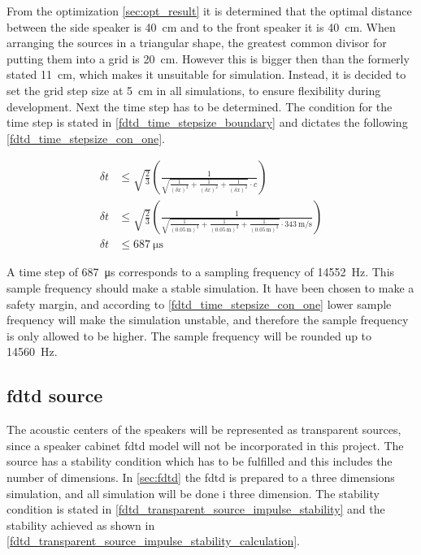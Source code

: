 From the optimization \autoref{sec:opt_result} it is determined that the optimal distance between the side speaker is \SI{40}{\centi\meter} and to the front speaker it is \SI{40}{\centi\meter}. When arranging the sources in a triangular shape, the greatest common divisor for putting them into a grid is \SI{20}{\centi\meter}. However this is bigger then than the formerly stated \SI{11}{\centi\meter}, which makes it unsuitable for simulation. Instead, it is decided to set the grid step size at \SI{5}{\centi\meter} in all simulations, to ensure flexibility during development. Next the time step has to be determined. The condition for the time step is stated in \autoref{fdtd_time_stepsize_boundary} and dictates the following \autoref{fdtd_time_stepsize_con_one}.
    
 
\begin{subequations}\label{fdtd_time_stepsize_con_one}
\begin{alignat}{2}
\delta t &\leq \sqrt{\frac{2}{3}}  \left( \frac{1}{\sqrt{\frac{1}{(\delta x)^2}+\frac{1}{(\delta x)^2}+\frac{1}{(\delta x)^2} }\cdot c} \right)\\
\delta t &\leq \sqrt{\frac{2}{3}}  \left( \frac{1}{\sqrt{\frac{1}{(\SI{0.05}{\meter})^2}+\frac{1}{(\SI{0.05}{\meter})^2}+\frac{1}{(\SI{0.05}{\meter})^2} }\cdot \SI{343}{\meter\per\second}} \right)\\
\delta t &\leq \SI{687}{\micro\second} 
\end{alignat}
\end{subequations}
    
A time step of \SI{687}{\micro\second}  corresponds to a sampling frequency of \SI{14552}{\hertz}. This sample frequency should make a stable simulation. It have been chosen to make a safety margin, and according to \autoref{fdtd_time_stepsize_con_one} lower sample frequency will make the simulation unstable, and therefore the sample frequency is only allowed to be higher. The sample frequency will be rounded up to \SI{14560}{\hertz}.
 
 

\subsection{\gls{fdtd} source}
The acoustic centers of the speakers will be represented as transparent sources, since a speaker cabinet \gls{fdtd} model will not be incorporated in this project. The source has a stability condition which has to be fulfilled and this includes the number of dimensions. In \autoref{sec:fdtd} the \gls{fdtd} is prepared to a three dimensions simulation, and all simulation will be done i three dimension.  The stability condition is stated in \autoref{fdtd_transparent_source_impulse_stability} and the stability achieved as shown in \autoref{fdtd_transparent_source_impulse_stability_calculation}.



